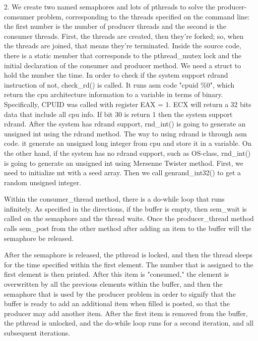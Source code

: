\documentclass[letterpaper,10pt]{article}
\begin{document}
2.
We create two named semaphores and lots of pthreads to solve the producer-comsumer problem, corresponding to the threads specified on the command line: the first number is the number of producer threads and the second is the consumer threads. First, the threads are created, then they're forked; so, when the threads are joined, that means they're terminated. Inside the source code, there is a static member that corresponds to the pthread\_mutex lock and the initial declaration of the consumer and producer method. We need a struct to hold the number the time. In order to check if the system support rdrand instruction of not, check\_rd() is called. It runs asm code "cpuid \%0", which return the cpu architecture information to a variable in terms of binary. Specifically, CPUID was called with register EAX = 1. ECX will return a 32 bits data that include all cpu info. If bit 30 is return 1 then the system support rdrand. After the system has rdrand support, rnd\_int() is going to generate an unsigned int using the rdrand method. The way to using rdrand is through asm code. it generate an unsigned long integer from cpu and store it in a variable. On the other hand, if the system has no rdrand support, such as OS-class, rnd\_int() is going to generate an unsigned int using Mersenne Twister method. First, we need to initialize mt with a seed array. Then we  call genrand\_int32() to get a random unsigned integer.

Within the consumer\_thread method, there is a do-while loop that runs infinitely. As specified in the directions, if the buffer is empty, then sem\_wait is called on the semaphore and the thread waits. Once the producer\_thread method calls sem\_post from the other method after adding an item to the buffer will the semaphore be released.\par

After the semaphore is released, the pthread is locked, and then the thread sleeps for the time specified within the first element. The number that is assigned to the first element is then printed. After this item is "consumed," the element is overwritten by all the previous elements within the buffer, and then the semaphore that is used by the producer problem in order to signify that the buffer is ready to add an additional item when filled is posted, so that the producer may add another item. After the first item is removed from the buffer, the pthread is unlocked, and the do-while loop runs for a second iteration, and all subsequent iterations.\par
\end{document}
